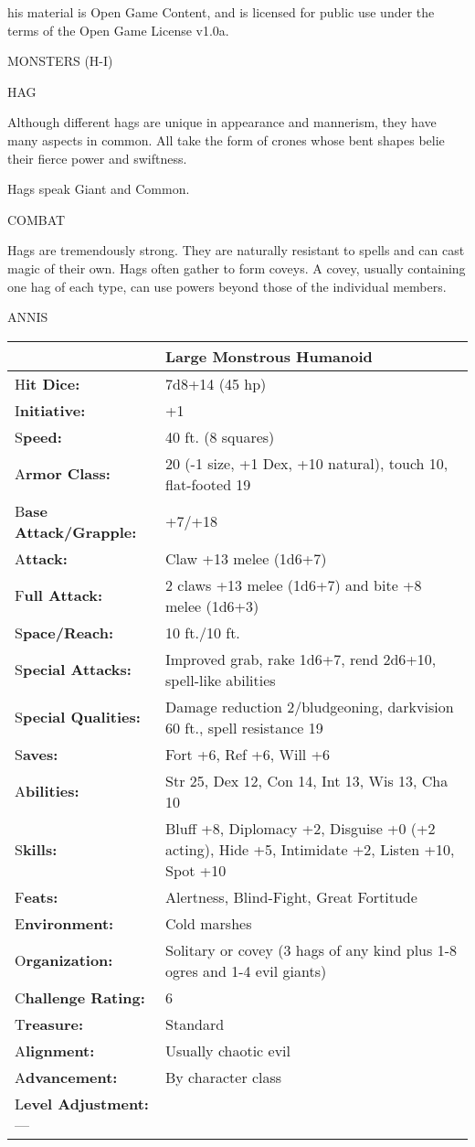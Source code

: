 \documentclass{article}
\begin{document}
his material is Open Game Content, and is licensed for public use under the terms 
of the Open Game License v1.0a.

{\LARGE{}MONSTERS (H-I)}

\vspace{12pt}
{\LARGE{}HAG}

Although different hags are unique in appearance and mannerism, they have many 
aspects in common. All take the form of crones whose bent shapes belie their fierce 
power and swiftness.

Hags speak Giant and Common.

COMBAT

Hags are tremendously strong. They are naturally resistant to spells and can cast 
magic of their own. Hags often gather to form coveys. A covey, usually containing 
one hag of each type, can use powers beyond those of the individual members.

ANNIS

\begin{tabular}{|>{\raggedright}p{88pt}|>{\raggedright}p{238pt}|}
\hline
  & Large Monstrous Humanoid\tabularnewline
\hline
H\textbf{it Dice:} & 7d8+14 (45 hp)\tabularnewline
\hline
I\textbf{nitiative:} & +1\tabularnewline
\hline
S\textbf{peed:} & 40 ft. (8 squares)\tabularnewline
\hline
A\textbf{rmor Class:} & 20 (-1 size, +1 Dex, +10 natural), touch 10, flat-footed 
19\tabularnewline
\hline
B\textbf{ase Attack/Grapple:} & +7/+18\tabularnewline
\hline
A\textbf{ttack:} & Claw +13 melee (1d6+7)\tabularnewline
\hline
F\textbf{ull Attack:} & 2 claws +13 melee (1d6+7) and bite +8 melee (1d6+3)\tabularnewline
\hline
S\textbf{pace/Reach:} & 10 ft./10 ft.\tabularnewline
\hline
S\textbf{pecial Attacks:} & Improved grab, rake 1d6+7, rend 2d6+10, spell-like 
abilities\tabularnewline
\hline
S\textbf{pecial Qualities:} & Damage reduction 2/bludgeoning, darkvision 60 ft., 
spell resistance 19\tabularnewline
\hline
S\textbf{aves:} & Fort +6, Ref +6, Will +6\tabularnewline
\hline
A\textbf{bilities:} & Str 25, Dex 12, Con 14, Int 13, Wis 13, Cha 10\tabularnewline
\hline
S\textbf{kills:} & Bluff +8, Diplomacy +2, Disguise +0 (+2 acting), Hide +5, Intimidate 
+2, Listen +10, Spot +10\tabularnewline
\hline
F\textbf{eats:} & Alertness, Blind-Fight, Great Fortitude\tabularnewline
\hline
E\textbf{nvironment:} & Cold marshes\tabularnewline
\hline
O\textbf{rganization:} & Solitary or covey (3 hags of any kind plus 1-8 ogres and 
1-4 evil giants)\tabularnewline
\hline
C\textbf{hallenge Rating:} & 6\tabularnewline
\hline
T\textbf{reasure:} & Standard\tabularnewline
\hline
A\textbf{lignment:} & Usually chaotic evil\tabularnewline
\hline
A\textbf{dvancement:} & By character class\tabularnewline
\hline
L\textbf{evel Adjustment:}--- & \tabularnewline
\hline
\end{tabular}
\end{document}
